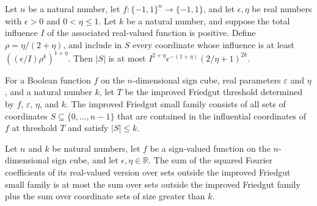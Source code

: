 \begin{theorem}
\label{FABL.card_improvedFriedgutCoordinates_le}
\leanok
{}
Let $n$ be a natural number, let $f:\{-1,1\}^n\to\{-1,1\}$, and let
$\epsilon,\eta$ be real numbers with $\epsilon>0$ and $0<\eta\leq1$. Let $k$ be a
natural number, and suppose the total influence $I$ of the associated real-valued
function is positive. Define $\rho=\eta/(2+\eta)$, and include in $S$ every
coordinate whose influence is at least $\left((\epsilon/I)\rho^k\right)^{1+\eta}$.
Then $|S|$ is at most $I^{2+\eta}\epsilon^{-(1+\eta)}(2/\eta+1)^{2k}$.
\end{theorem}

\begin{definition}
\label{FABL.improvedFriedgutSmallFamily}
\leanok
{}
For a Boolean function $f$ on the $n$-dimensional sign cube, real parameters
$\varepsilon$ and $\eta$, and a natural number $k$, let $T$ be the improved Friedgut
threshold determined by $f$, $\varepsilon$, $\eta$, and $k$. The improved Friedgut
small family consists of all sets of coordinates $S\subseteq\{0,\ldots,n-1\}$ that are
contained in the influential coordinates of $f$ at threshold $T$ and satisfy $|S|\le k$.
\end{definition}

\begin{theorem}
\label{FABL.fourierWeightOutside_improvedFriedgutSmallFamily_le_add}
\leanok
{}
Let $n$ and $k$ be natural numbers, let $f$ be a sign-valued function on the
$n$-dimensional sign cube, and let $\epsilon,\eta\in\mathbb{R}$. The sum of the squared
Fourier coefficients of its real-valued version over sets outside the improved Friedgut
small family is at most the sum over sets outside the improved Friedgut family plus the
sum over coordinate sets of size greater than $k$.
\end{theorem}

